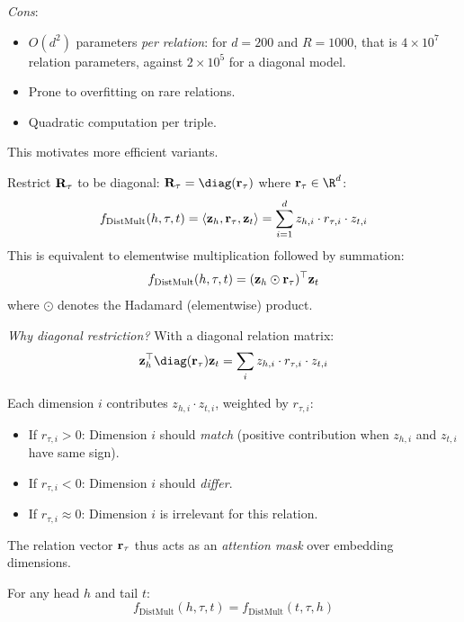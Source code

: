 \begin{notechapter}
\begin{keyidea}
\emph{Cons}:
\begin{itemize}
    \item $O(d^2)$ parameters \emph{per relation}: for $d = 200$ and $R = 1000$, that is $4\times10^7$ relation parameters, against $2\times10^5$ for a diagonal model.
    \item Prone to overfitting on rare relations.
    \item Quadratic computation per triple.
\end{itemize}

This motivates more efficient variants.
\end{keyidea}

\begin{definition}
Restrict $\mathbf{R}_\tau$ to be diagonal: $\vect{R}_\tau = \diag(\vect{r}_\tau)$ where $\vect{r}_\tau \in \R^d$:
\begin{equation}
f_{\text{DistMult}}(h, \tau, t) = \langle \mathbf{z}_h, \mathbf{r}_\tau, \mathbf{z}_t \rangle = \sum_{i=1}^{d} z_{h,i} \cdot r_{\tau,i} \cdot z_{t,i}
\end{equation}
This is equivalent to elementwise multiplication followed by summation:
\[
f_{\text{DistMult}}(h, \tau, t) = (\mathbf{z}_h \odot \mathbf{r}_\tau)^\top \mathbf{z}_t
\]
where $\odot$ denotes the Hadamard (elementwise) product.
\end{definition}

\begin{intuition}
\emph{Why diagonal restriction?}
With a diagonal relation matrix:
\[
\vect{z}_h^\top \diag(\vect{r}_\tau) \vect{z}_t = \sum_i z_{h,i} \cdot r_{\tau,i} \cdot z_{t,i}
\]

Each dimension $i$ contributes $z_{h,i} \cdot z_{t,i}$, weighted by $r_{\tau,i}$:
\begin{itemize}
    \item If $r_{\tau,i} > 0$: Dimension $i$ should \emph{match} (positive contribution when $z_{h,i}$ and $z_{t,i}$ have same sign).
    \item If $r_{\tau,i} < 0$: Dimension $i$ should \emph{differ}.
    \item If $r_{\tau,i} \approx 0$: Dimension $i$ is irrelevant for this relation.
\end{itemize}

The relation vector $\mathbf{r}_\tau$ thus acts as an \emph{attention mask} over embedding dimensions.
\end{intuition}

\begin{proposition}
For any head $h$ and tail $t$:
\[
f_{\text{DistMult}}(h, \tau, t) = f_{\text{DistMult}}(t, \tau, h)
\]
\end{proposition}


\end{notechapter}
